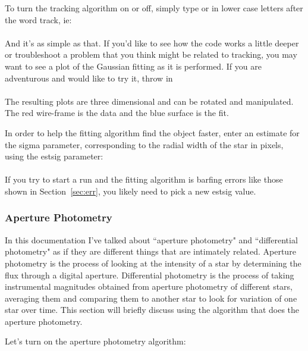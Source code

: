 \documentclass{article}
\begin{document}
	To turn the tracking algorithm on or off, simply type  or  in lower case letters after the word \textsf{track}, ie:\\
	
\indent {}\\

	And it's as simple as that. If you'd like to see how the code works a little deeper or troubleshoot a problem that you think might be related to tracking, you may want to see a plot of the Gaussian fitting as it is performed. If you are adventurous and would like to try it, throw in\\

\indent {}\\

The resulting plots are three dimensional and can be rotated and manipulated. The red wire-frame is the data and the blue surface is the fit. 

	In order to help the fitting algorithm find the object faster, enter an estimate for the sigma parameter, corresponding to the radial width of the star in pixels, using the \textsf{estsig} parameter: \\
	
\indent {}\\

If you try to start a run and the fitting algorithm is barfing errors like those shown in Section~\ref{sec:err}, you likely need to pick a new \textsf{estsig} value. 

\subsubsection{Aperture Photometry}

In this documentation I've talked about ``aperture photometry" and ``differential photometry" as if they are different things that are intimately related. Aperture photometry is the process of looking at the intensity of a star by determining the flux through a digital aperture. Differential photometry is the process of taking instrumental magnitudes obtained from aperture photometry of different stars, averaging them and comparing them to another star to look for variation of one star over time. This section will briefly discuss using the algorithm that does the aperture photometry.

	Let's turn on the aperture photometry algorithm:\\
	
\indent {}\\
\end{document}
